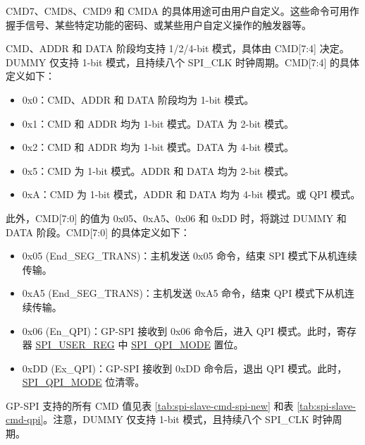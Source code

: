 \documentclass[main\_\_CN.tex]{subfiles}
\begin{document}
CMD7、CMD8、CMD9 和 CMDA 的具体用途可由用户自定义。这些命令可用作握手信号、某些特定功能的密码、或某些用户自定义操作的触发器等。

CMD、ADDR 和 DATA 阶段均支持 1/2/4-bit 模式，具体由 CMD[7:4] 决定。DUMMY 仅支持 1-bit 模式，且持续八个 SPI\_CLK 时钟周期。CMD[7:4] 的具体定义如下：

\begin{itemize}
    \item 0x{}0：CMD、ADDR 和 DATA 阶段均为 1-bit 模式。
    \item 0x{}1：CMD 和 ADDR 均为 1-bit 模式。DATA 为 2-bit 模式。
    \item 0x{}2：CMD 和 ADDR 均为 1-bit 模式。DATA 为 4-bit 模式。
    \item 0x{}5：CMD 为 1-bit 模式。ADDR 和 DATA 均为 2-bit 模式。
    \item 0x{}A：CMD 为 1-bit 模式，ADDR 和 DATA 均为 4-bit 模式。或 QPI 模式。
\end{itemize}

此外，CMD[7:0] 的值为 0x{}05、0x{}A5、0x{}06 和 0x{}DD 时，将跳过 DUMMY 和 DATA 阶段。CMD[7:0] 的具体定义如下：

\begin{itemize}
    \item \label{cmd:ENDSEGTRANS}0x{}05 (End\_SEG\_TRANS)：主机发送 0x{}05 命令，结束 SPI 模式下从机连续传输。
    \item 0x{}A5 (End\_SEG\_TRANS)：主机发送 0x{}A5 命令，结束 QPI 模式下从机连续传输。
    \item 0x{}06 (En\_QPI)：GP-SPI 接收到 0x{}06 命令后，进入 QPI 模式。此时，寄存器  \hyperref[regdesc:SPIUSERREG]{SPI\_USER\_REG} 中  \hyperref[fielddesc:SPIQPIMODE]{SPI\_QPI\_MODE} 置位。
    \item 0x{}DD (Ex\_QPI)：GP-SPI 接收到 0x{}DD 命令后，退出 QPI 模式。此时， \hyperref[fielddesc:SPIQPIMODE]{SPI\_QPI\_MODE} 位清零。
\end{itemize}


GP-SPI 支持的所有 CMD 值见表  \ref{tab:spi-slave-cmd-spi-new} 和表  \ref{tab:spi-slave-cmd-qpi}。注意，DUMMY 仅支持 1-bit 模式，且持续八个 SPI\_CLK 时钟周期。
\end{document}
